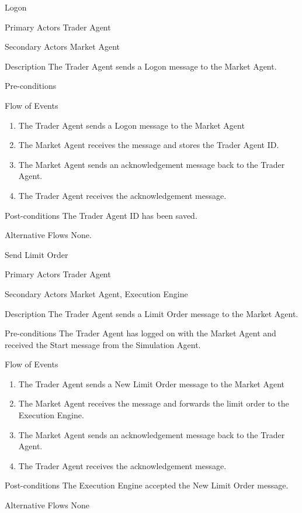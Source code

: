 \begin{usecase}{Logon}
\item[Primary Actors] Trader Agent
\item[Secondary Actors] Market Agent
\item[Description] The Trader Agent sends a Logon message to the Market Agent.
\item[Pre-conditions] 
\item[Flow of Events] 
\begin{enumerate}
\item The Trader Agent sends a Logon message to the Market Agent
\item The Market Agent receives the message and stores the Trader Agent ID.
\item The Market Agent sends an acknowledgement message back to the Trader Agent.
\item The Trader Agent receives the acknowledgement message.
\end{enumerate}
\item[Post-conditions] The Trader Agent ID has been saved. \item[Alternative Flows] None.
\end{usecase}
  
\begin{usecase}{Send Limit Order}
\item[Primary Actors] Trader Agent
\item[Secondary Actors] Market Agent, Execution Engine
\item[Description] The Trader Agent sends a Limit Order message to the Market Agent.
\item[Pre-conditions] The Trader Agent has logged on with the Market Agent and received the Start message from the Simulation Agent.
\item[Flow of Events] 
\begin{enumerate}
\item The Trader Agent sends a New Limit Order message to the Market Agent
\item The Market Agent receives the message and forwards the limit order to the Execution Engine.
\item The Market Agent sends an acknowledgement message back to the Trader Agent.
\item The Trader Agent receives the acknowledgement message.
\end{enumerate}
\item[Post-conditions] The Execution Engine accepted the New Limit Order message.
\item[Alternative Flows] None
\end{usecase}

